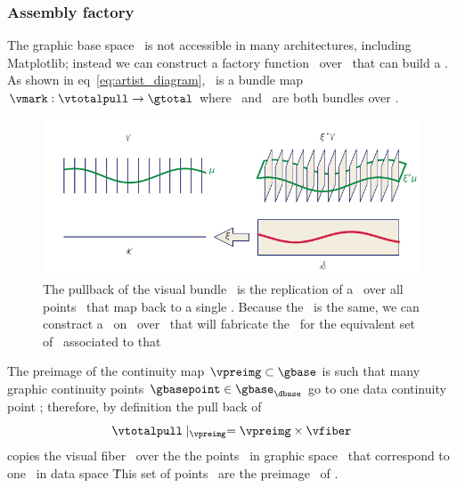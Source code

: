 \documentclass[../main.tex]{subfiles}
\begin{document}
\subsubsection{Assembly factory \vmarkd}
The graphic base space \gbase\ is not accessible in many architectures, including Matplotlib; instead we can construct a factory function \vmarkd\ over \dbase\ that can build a \vmark. As shown in eq~\ref{eq:artist_diagram}, \vmark\ is a bundle map $\vmark: \vtotalpull\rightarrow \gtotal$ where \vtotalpull\ and \gtotal\ are both bundles over \gbase.
\begin{figure}[H]
    \includegraphics[width=1\textwidth]{figures/math/q_hat.png}
    \caption{The pullback of the visual bundle \vtotalpull\ is the replication of a \vsection\ over all points \gbasepoint\ that map back to a single \dbasepoint. Because the \vsection\ is the same, we can constract a \vmarkd\ on \vsection\ over \dbasepoint\ that will fabricate the \vmark\ for the equivalent set of \gbasepoint\ associated to that \dbasepoint}
    \label{fig:artist_q_hat}
\end{figure}
 
The preimage of the continuity map $\vpreimg \subset \gbase$ is such that many graphic continuity points $\gbasepoint \in \gbase_{\dbase}$ go to one data continuity point \dbasepoint; therefore, by definition the pull back of \vsection\
\begin{equation}
    \vtotalpull \mid_{\vpreimg} = \vpreimg \times \vfiber
\end{equation}
copies the visual fiber \vfiber\ over the the points \gbasepoint\ in graphic space \gbase\ that correspond to one \dbasepoint\ in data space \dbase\. This set of points \gbasepoint\ are the preimage \vpreimg\ of \dbasepoint. 
\end{document}
